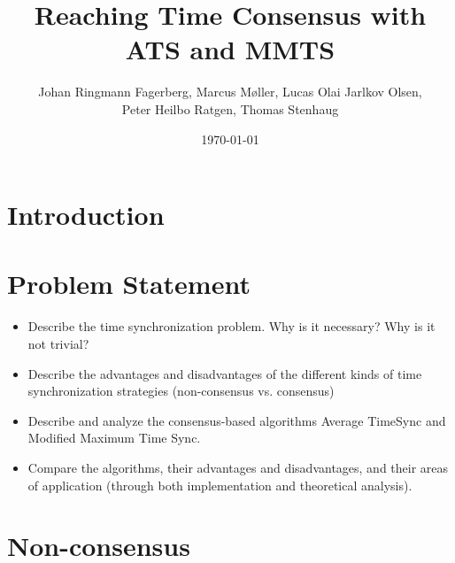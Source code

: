 \documentclass{sciposter}
\title{Reaching Time Consensus with ATS and MMTS}
\date{\today}
\author{Johan Ringmann Fagerberg, Marcus Møller, Lucas Olai Jarlkov Olsen,\\
  Peter Heilbo Ratgen, Thomas Stenhaug}
\institute{Institut for Matematik og Datalogi\\
            Syddansk Universitet}
\begin{document}
\maketitle

\begin{multicols}{3}


\section{Introduction}

\begin{figure}
    \centering
    \begin{tikzpicture}[inner sep=0pt,minimum size=0.4cm,scale=2.5]
        
    \end{tikzpicture}
    \hspace{2em}
    \begin{tikzpicture}[inner sep=0pt,minimum size=0.4cm,scale=2.5]
        
    \end{tikzpicture}
\end{figure}

\lipsum[5]

\section{Problem Statement}
\begin{itemize}
    \item Describe the time synchronization problem. Why is it necessary? Why is it not trivial? 
    \item Describe the advantages and disadvantages of the different kinds of time synchronization strategies (non-consensus vs. consensus)
    \item Describe and analyze the consensus-based algorithms Average TimeSync and Modified Maximum Time Sync.
    \item Compare the algorithms, their advantages and disadvantages, and their areas of application (through both implementation and theoretical analysis).
\end{itemize}

\section{Non-consensus}


\end{multicols}
\end{document}
